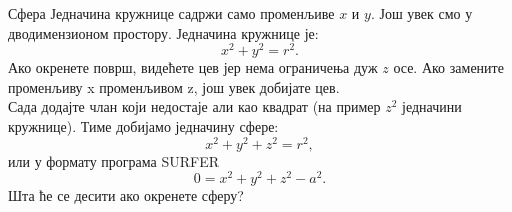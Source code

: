 \begin{surferPage}{Сфера}
Једначина кружнице садржи само променљиве $x$ и $y$. Још увек смо у дводимензионом простору.
Једначина кружнице је:
\[x^2+y^2=r^2.\]
Ако окренете површ, видећете цев јер нема ограничења дуж $z$ осе. Ако замените променљиву x променљивом  z, још увек добијате цев.\\
Сада додајте члан који недостаје али као квадрат (на пример $z^2$ једначини кружнице). 
Тиме добијамо једначину сфере:
\[x^2+y^2+z^2=r^2,\]
или у формату програма SURFER
\[0=x^2+y^2+z^2-a^2.\]
Шта ће се десити ако окренете сферу?
\end{surferPage}
